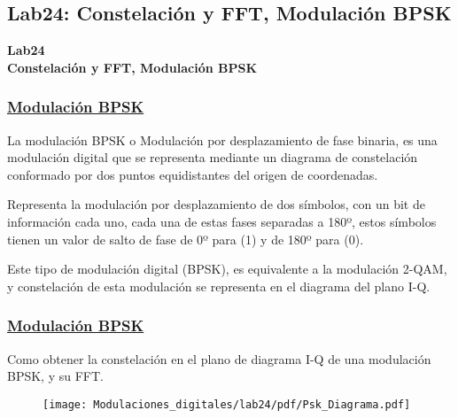 \subsection{Lab24: Constelación y FFT, Modulación BPSK}

\begin{frame}{}


\bfseries{\textrm{\LARGE Lab24\\ \Large Constelación y FFT, Modulación BPSK}}
\raggedright
\end{frame}

\begin{frame}
   
  \frametitle{\underline{\textbf{Modulación BPSK}}}
  
   \begin{flushleft}
    La modulación BPSK o Modulación por desplazamiento de fase binaria, es una modulación  digital que se representa mediante un diagrama de constelación conformado por dos puntos equidistantes del origen de coordenadas.
   \end{flushleft}
   \begin{flushleft}
   Representa la modulación por desplazamiento de dos símbolos, con un bit de información cada uno, cada una de estas fases separadas a 180º, estos símbolos tienen un valor de salto de fase de 0º para (1) y de 180º para (0).
   \end{flushleft}
   \begin{flushleft}
   Este tipo de modulación digital (BPSK), es equivalente a la modulación 2-QAM, y  constelación de esta modulación se representa en el diagrama del plano I-Q.
   \end{flushleft} 
 \end{frame}

\begin{frame}
   
  \frametitle{\underline{\textbf{Modulación BPSK}}}
   \begin{flushleft}
   Como obtener la constelación en el plano de diagrama I-Q de una modulación BPSK, y su FFT.
   \end{flushleft}
   \begin{figure}[H]
\vspace{-3mm}
\centering
\texttt{[image: Modulaciones\_digitales/lab24/pdf/Psk\_Diagrama.pdf]}
\end{figure}
\end{frame}

